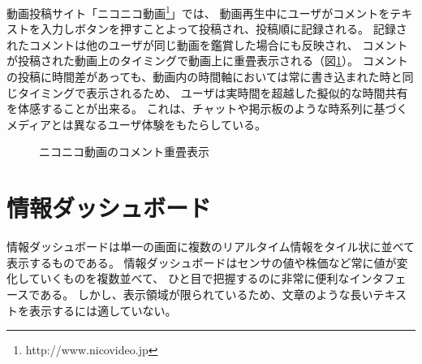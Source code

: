 動画投稿サイト「ニコニコ動画\footnote{http://www.nicovideo.jp}」では、
動画再生中にユーザがコメントをテキストを入力しボタンを押すことよって投稿され、投稿順に記録される。
記録されたコメントは他のユーザが同じ動画を鑑賞した場合にも反映され、
コメントが投稿された動画上のタイミングで動画上に重畳表示される（図\ref{niconico}）。
コメントの投稿に時間差があっても、動画内の時間軸においては常に書き込まれた時と同じタイミングで表示されるため、
ユーザは実時間を超越した擬似的な時間共有を体感することが出来る。
これは、チャットや掲示板のような時系列に基づくメディアとは異なるユーザ体験をもたらしている。

\begin{figure}[H]
\centering
{}
\caption{ニコニコ動画のコメント重畳表示}
\label{niconico}
\end{figure}


\section{情報ダッシュボード}

情報ダッシュボードは単一の画面に複数のリアルタイム情報をタイル状に並べて表示するものである\cite{few}。
情報ダッシュボードはセンサの値や株価など常に値が変化していくものを複数並べて、
ひと目で把握するのに非常に便利なインタフェースである。
しかし、表示領域が限られているため、文章のような長いテキストを表示するには適していない。